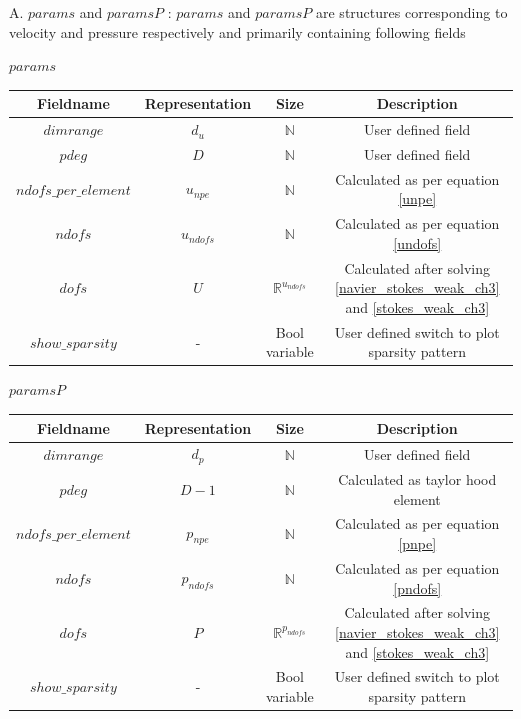 \documentclass[a4paper,12pt]{book}
\begin{document}
A. $params$ and $paramsP$ : $params$ and $paramsP$ are structures corresponding to velocity and pressure respectively and primarily containing following fields
\begin{center}
$params$\\
\begin{tabular}{|c|c|c|c|}
\hline
\textbf{Fieldname} & \textbf{Representation} & \textbf{Size} & \textbf{Description}\\
\hline
$dimrange$ & $d_u$ & $\mathbb{N}$ & User defined field\\
\hline
$pdeg$ & $D$ & $\mathbb{N}$ & User defined field\\
\hline
$ndofs\_per\_element$ & $u_{npe}$ & $\mathbb{N}$ & Calculated as per equation \ref{unpe}\\
\hline
$ndofs$ & $u_{ndofs}$ & $\mathbb{N}$ & Calculated as per equation \ref{undofs}\\
\hline
$dofs$ & $U$ & $\mathbb{R}^{u_{ndofs}}$ & Calculated after solving \ref{navier_stokes_weak_ch3} and \ref{stokes_weak_ch3}\\
\hline
$show\_sparsity$ & - & Bool variable & User defined switch to plot sparsity pattern\\
\hline
\end{tabular}
\end{center}
\begin{center}
$paramsP$\\
\begin{tabular}{|c|c|c|c|}
\hline
\textbf{Fieldname} & \textbf{Representation} & \textbf{Size} & \textbf{Description}\\
\hline
$dimrange$ & $d_p$ & $\mathbb{N}$ & User defined field\\
\hline
$pdeg$ & $D-1$ & $\mathbb{N}$ & Calculated as taylor hood element\\
\hline
$ndofs\_per\_element$ & $p_{npe}$ & $\mathbb{N}$ & Calculated as per equation \ref{pnpe}\\
\hline
$ndofs$ & $p_{ndofs}$ & $\mathbb{N}$ & Calculated as per equation \ref{pndofs}\\
\hline
$dofs$ & $P$ & $\mathbb{R}^{p_{ndofs}}$ & Calculated after solving \ref{navier_stokes_weak_ch3} and \ref{stokes_weak_ch3}\\
\hline
$show\_sparsity$ & - & Bool variable & User defined switch to plot sparsity pattern\\
\hline
\end{tabular}
\end{center}
\end{document}
